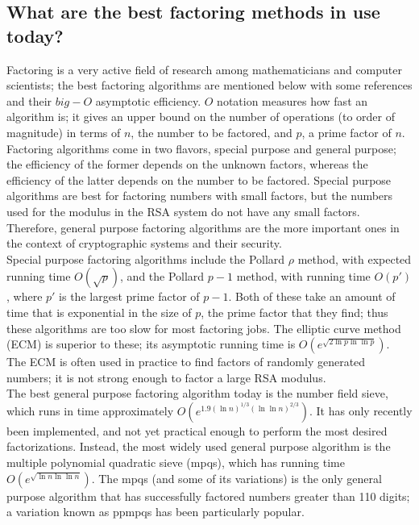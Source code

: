 \subsection{What are the best factoring methods in use today?}
\label{what_fac_use}

Factoring is a very active field of research among mathematicians and
computer scientists; the best factoring algorithms are mentioned below
with some references and their $big-O$ asymptotic efficiency. $O$ notation
measures how fast an algorithm is; it gives an upper bound on the
number of operations (to order of magnitude) in terms of $n$, the number
to be factored, and $p$, a prime factor of $n$.\\

Factoring algorithms come in two flavors, special purpose and general
purpose; the efficiency of the former depends on the unknown factors,
whereas the efficiency of the latter depends on the number to be
factored. Special purpose algorithms are best for factoring numbers
with small factors, but the numbers used for the modulus in the RSA
system do not have any small factors. Therefore, general purpose
factoring algorithms are the more important ones in the context of
cryptographic systems and their security.\\

Special purpose factoring algorithms include the Pollard $\rho$ method,
with expected running time $O(\sqrt{p})$, and the Pollard $p-1$ method, with
running time $O(p')$, where $p'$ is the largest prime factor of $p-1$. Both
of these take an amount of time that is exponential in the size of $p$,
the prime factor that they find; thus these algorithms are too slow for
most factoring jobs. The elliptic curve method (ECM) is superior to
these; its asymptotic running time is $O(e^{\sqrt{2 \ln p \ln \ln p}})$.
The ECM is often used in practice to find factors of randomly generated
numbers; it is not strong enough to factor a large RSA modulus.\\


The best general purpose factoring algorithm today is the number field
sieve, which runs in time approximately $O(e^{1.9 (\ln n)^{1/3} (\ln \ln
n)^{2/3}} )$. It has only recently been implemented, and not yet practical
enough to perform the most desired factorizations. Instead, the most widely
used general purpose algorithm is the multiple polynomial quadratic sieve
(mpqs), which has running time $O(e^{\sqrt{\ln n \ln \ln n}})$. The mpqs (and
some of its variations) is the only general purpose algorithm that has
successfully factored numbers greater than 110 digits; a variation known as
ppmpqs has been particularly popular.\\

